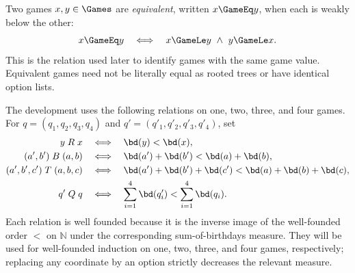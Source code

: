 \begin{definition}
  \label{def:game-equivalence}
  \leanok
  Two games \(x,y\in\Games\) are \emph{equivalent}, written \(x\GameEq y\), when each is
  weakly below the other:
  \[
    x\GameEq y \quad\Longleftrightarrow\quad
    x\GameLe y\ \wedge\ y\GameLe x.
  \]
  This is the relation used later to identify games with the same game value.  Equivalent games
  need not be literally equal as rooted trees or have identical option lists.
\end{definition}

\begin{definition}
  \label{def:game-inductions}
  \leanok
  The development uses the following relations on one, two, three, and four games.  For
  \(q=(q_1,q_2,q_3,q_4)\) and \(q'=(q'_1,q'_2,q'_3,q'_4)\), set
  \[
    \begin{aligned}
      y\mathrel R x
        &\quad\Longleftrightarrow\quad \bd(y)<\bd(x),\\
      (a',b')\mathrel B(a,b)
        &\quad\Longleftrightarrow\quad
          \bd(a')+\bd(b')<\bd(a)+\bd(b),\\
      (a',b',c')\mathrel T(a,b,c)
        &\quad\Longleftrightarrow\quad
          \bd(a')+\bd(b')+\bd(c')<\bd(a)+\bd(b)+\bd(c),\\
      q'\mathrel Qq
        &\quad\Longleftrightarrow\quad
          \sum_{i=1}^{4}\bd(q'_i)<\sum_{i=1}^{4}\bd(q_i).
    \end{aligned}
  \]
  Each relation is well founded because it is the inverse image of the well-founded order
  \(<\) on \(\mathbb N\) under the corresponding sum-of-birthdays measure.  They will be used
  for well-founded induction on one, two, three, and four games, respectively; replacing any
  coordinate by an option strictly decreases the relevant measure.
\end{definition}

